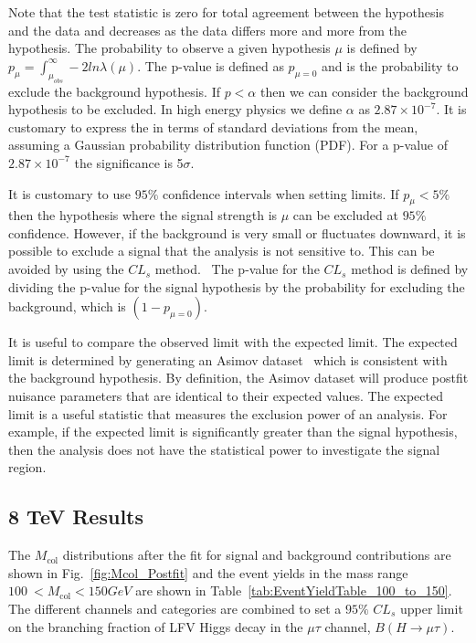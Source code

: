 \documentclass[oneside, letterpaper, oldfontcommands]{memoir}
\begin{document}
{{{\qquad Note that the test statistic is zero for total agreement between the hypothesis and the data and decreases as the data differs more and more from the hypothesis. The probability to observe a given hypothesis $\mu$ is defined by $p_{\mu} = \int_{\mu_{obs}}^{\infty} - 2 ln \lambda(\mu)$. The p-value is defined as $p_{\mu=0}$ and is the probability to exclude the background hypothesis. If $p<\alpha$ then we can consider the background hypothesis to be excluded. In high energy physics we define $\alpha$ as $2.87 \times 10^{-7}$. It is customary to express the in terms of standard deviations from the mean, assuming a Gaussian probability distribution function (PDF). For a p-value of $2.87 \times 10^{-7}$ the significance is 5$\sigma$. 

\qquad It is customary to use $95\%$ confidence intervals when setting limits. If $p_{\mu} < 5\%$ then the hypothesis where the signal strength is $\mu$ can be excluded at $95\%$ confidence. However, if the background is very small or fluctuates downward, it is possible to exclude a signal that the analysis is not sensitive to. This can be avoided by using the $CL_{s}$ method.~\cite{Read:451614} The p-value for the $CL_{s}$ method is defined by dividing the p-value for the signal hypothesis by the probability for excluding the background, which is $(1-p_{\mu=0})$.

\qquad It is useful to compare the observed limit with the expected limit. The expected limit is determined by generating an Asimov dataset~\cite{Cowan:2010js} which is consistent with the background hypothesis. By definition, the Asimov dataset will produce postfit nuisance parameters that are identical to their expected values. The expected limit is a useful statistic that measures the exclusion power of an analysis. For example, if the expected limit is significantly greater than the signal hypothesis, then the analysis does not have the statistical power to investigate the signal region. 


\subsection{8 TeV Results}
The $M_\text{col}$ distributions after the fit for signal and background contributions are shown in Fig.~\ref{fig:Mcol_Postfit} and the
event yields in the mass range $100\:  < M_\text{col} < 150GeV$ are shown in Table~\ref{tab:EventYieldTable_100_to_150}.
The different channels and categories are combined  to set a $95\%$ $CL_{s}$  upper limit on the branching
fraction of LFV Higgs decay in the  $\mu \tau$ channel, $B(H\rightarrow\mu\tau)$.

}}}
\end{document}
